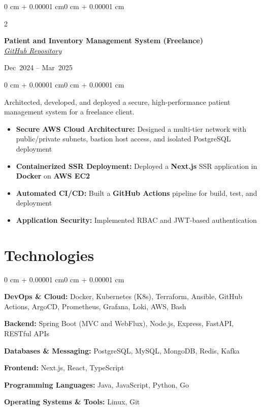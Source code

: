 \documentclass[10pt, letterpaper]{article}
\let\oldhref\href
\renewcommand{\href}[2]{\oldhref{#1}{\textit{\underline{#2}}}}
\newenvironment{highlights}{
    \begin{itemize}[
        topsep=0.10 cm,
        parsep=0.10 cm,
        partopsep=0pt,
        itemsep=0pt,
        leftmargin=0 cm + 10pt
    ]
}{
    \end{itemize}
}
\newenvironment{onecolentry}{
    \begin{adjustwidth}{0 cm + 0.00001 cm}{0 cm + 0.00001 cm}
}{
    \end{adjustwidth}
}
\newenvironment{twocolentry}[2][]{
    \onecolentry
    \def\secondColumn{#2}
    \setcolumnwidth{\fill, 4.5 cm}
    \begin{paracol}{2}
}{
    \switchcolumn \raggedleft \secondColumn
    \end{paracol}
    \endonecolentry
}
\begin{document}
    \vspace{0.2 cm}

    \begin{twocolentry}{
        Dec~2024 -- Mar~2025
    }
        \textbf{Patient and Inventory Management System (Freelance)} \\
        \href{https://github.com/Color-Novels/PMS}{GitHub Repository}
    \end{twocolentry}

    \vspace{0.10 cm}

    \begin{onecolentry}
        Architected, developed, and deployed a secure, high-performance patient management system for a freelance client.
        \begin{highlights}
            \item \textbf{Secure AWS Cloud Architecture:} Designed a multi-tier network with public/private subnets, bastion host access, and isolated PostgreSQL deployment
            \item \textbf{Containerized SSR Deployment:} Deployed a \textbf{Next.js} SSR application in \textbf{Docker} on \textbf{AWS EC2}
            \item \textbf{Automated CI/CD:} Built a \textbf{GitHub Actions} pipeline for build, test, and deployment
            \item \textbf{Application Security:} Implemented RBAC and JWT-based authentication
        \end{highlights}
    \end{onecolentry}

    \vspace{0.2 cm}

    \section{Technologies}
    \begin{onecolentry}
        \textbf{DevOps \& Cloud:} Docker, Kubernetes (K8s), Terraform, Ansible, GitHub Actions, ArgoCD, Prometheus, Grafana, Loki, AWS, Bash

        \vspace{0.2 cm}

        \textbf{Backend:} Spring Boot (MVC and WebFlux), Node.js, Express, FastAPI, RESTful APIs

        \vspace{0.2 cm}

        \textbf{Databases \& Messaging:} PostgreSQL, MySQL, MongoDB, Redis, Kafka

        \vspace{0.2 cm}

        \textbf{Frontend:} Next.js, React, TypeScript

        \vspace{0.2 cm}

        \textbf{Programming Languages:} Java, JavaScript, Python, Go

        \vspace{0.2 cm}

        \textbf{Operating Systems \& Tools:} Linux, Git
    \end{onecolentry}
\end{document}
